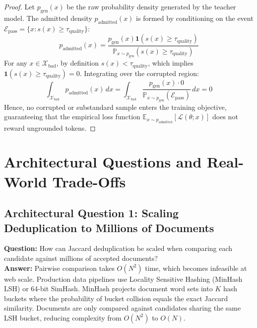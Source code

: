 \documentclass[11pt,a4paper]{article}
\theoremstyle{definition}
\begin{document}
\begin{proof}
Let $p_{\text{gen}}(x)$ be the raw probability density generated by the teacher model. The admitted density $p_{\text{admitted}}(x)$ is formed by conditioning on the event $\mathcal{E}_{\text{pass}} = \{x : s(x) \ge \tau_{\text{quality}}\}$:
\begin{equation}
p_{\text{admitted}}(x) = \frac{p_{\text{gen}}(x) \mathbf{1}(s(x) \ge \tau_{\text{quality}})}{\mathbb{P}_{x \sim p_{\text{gen}}}(s(x) \ge \tau_{\text{quality}})}
\end{equation}
For any $x \in \mathcal{X}_{\text{bad}}$, by definition $s(x) < \tau_{\text{quality}}$, which implies $\mathbf{1}(s(x) \ge \tau_{\text{quality}}) = 0$.
Integrating over the corrupted region:
\begin{equation}
\int_{\mathcal{X}_{\text{bad}}} p_{\text{admitted}}(x) \, dx = \int_{\mathcal{X}_{\text{bad}}} \frac{p_{\text{gen}}(x) \cdot 0}{\mathbb{P}_{x \sim p_{\text{gen}}}(\mathcal{E}_{\text{pass}})} \, dx = 0
\end{equation}
Hence, no corrupted or substandard sample enters the training objective, guaranteeing that the empirical loss function $\mathbb{E}_{x \sim p_{\text{admitted}}}[\mathcal{L}(\theta; x)]$ does not reward ungrounded tokens.
\end{proof}

\section{Architectural Questions and Real-World Trade-Offs}

\subsection{Architectural Question 1: Scaling Deduplication to Millions of Documents}
\textbf{Question:} How can Jaccard deduplication be scaled when comparing each candidate against millions of accepted documents?\\
\textbf{Answer:} Pairwise comparison takes $O(N^2)$ time, which becomes infeasible at web scale. Production data pipelines use Locality Sensitive Hashing (MinHash LSH) or 64-bit SimHash. MinHash projects document word sets into $K$ hash buckets where the probability of bucket collision equals the exact Jaccard similarity. Documents are only compared against candidates sharing the same LSH bucket, reducing complexity from $O(N^2)$ to $O(N)$.
\end{document}
